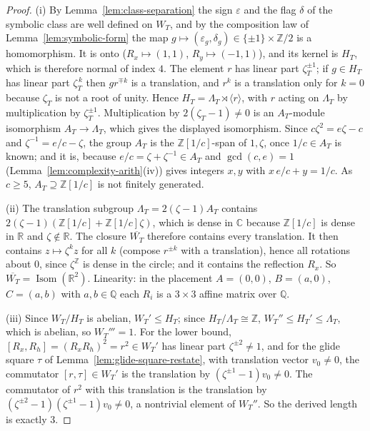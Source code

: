 \documentclass[11pt]{article}
\theoremstyle{plain}
\theoremstyle{definition}
\theoremstyle{remark}
\newcommand{\Z}{\mathbb{Z}}
\newcommand{\Q}{\mathbb{Q}}
\newcommand{\R}{\mathbb{R}}
\newcommand{\C}{\mathbb{C}}
\DeclareMathOperator{\Isom}{Isom}
\begin{document}
\begin{proof}
(i) By Lemma~\ref{lem:class-separation} the sign $\varepsilon$ and the flag
$\delta$ of the symbolic class are well defined on $W_T$, and by the
composition law of Lemma~\ref{lem:symbolic-form} the map
$g\mapsto(\varepsilon_g,\delta_g)\in\{\pm1\}\times\Z/2$ is a homomorphism. It
is onto ($R_x\mapsto(1,1)$, $R_y\mapsto(-1,1)$), and its kernel is $H_T$, which
is therefore normal of index $4$. The element $r$ has linear part
$\zeta_T^{\pm1}$; if $g\in H_T$ has linear part $\zeta_T^{\,k}$ then $gr^{\mp k}$
is a translation, and $r^k$ is a translation only for $k=0$ because
$\zeta_T$ is not a root of unity. Hence $H_T=\Lambda_T\rtimes\langle r\rangle$,
with $r$ acting on $\Lambda_T$ by multiplication by $\zeta_T^{\pm1}$.
Multiplication by $2(\zeta_T-1)\neq0$ is an $A_T$-module isomorphism
$A_T\to\Lambda_T$, which gives the displayed isomorphism. Since
$c\zeta^2=e\zeta-c$ and $\zeta^{-1}=e/c-\zeta$, the group $A_T$ is the
$\Z[1/c]$-span of $1,\zeta$, once $1/c\in A_T$ is known; and it is, because
$e/c=\zeta+\zeta^{-1}\in A_T$ and $\gcd(c,e)=1$
(Lemma~\ref{lem:complexity-arith}(iv)) gives integers $x,y$ with
$x\,e/c+y=1/c$. As $c\ge5$, $A_T\supseteq\Z[1/c]$ is not finitely generated.

(ii) The translation subgroup $\Lambda_T=2(\zeta-1)A_T$ contains
$2(\zeta-1)(\Z[1/c]+\Z[1/c]\zeta)$, which is dense in $\C$ because $\Z[1/c]$ is
dense in $\R$ and $\zeta\notin\R$. The closure $\overline{W_T}$ therefore
contains every translation. It then contains $z\mapsto\zeta^kz$ for all $k$
(compose $r^{\pm k}$ with a translation), hence all rotations about $0$, since
$\zeta^{\Z}$ is dense in the circle; and it contains the reflection $R_x$. So
$\overline{W_T}=\Isom(\R^2)$. Linearity: in the placement $A=(0,0)$,
$B=(a,0)$, $C=(a,b)$ with $a,b\in\Q$ each $R_i$ is a $3\times3$ affine matrix
over $\Q$.

(iii) Since $W_T/H_T$ is abelian, $W_T'\le H_T$; since $H_T/\Lambda_T\cong\Z$,
$W_T''\le H_T'\le\Lambda_T$, which is abelian, so $W_T'''=1$. For the lower
bound, $[R_x,R_h]=(R_xR_h)^2=r^2\in W_T'$ has linear part $\zeta^{\pm2}\ne1$, and
for the glide square $\tau$ of Lemma~\ref{lem:glide-square-restate}, with
translation vector $v_0\ne0$, the commutator $[r,\tau]\in W_T'$ is the
translation by $(\zeta^{\pm1}-1)v_0\ne0$. The commutator of $r^2$ with this
translation is the translation by $(\zeta^{\pm2}-1)(\zeta^{\pm1}-1)v_0\ne0$, a
nontrivial element of $W_T''$. So the derived length is exactly $3$.


\end{proof}
\end{document}

